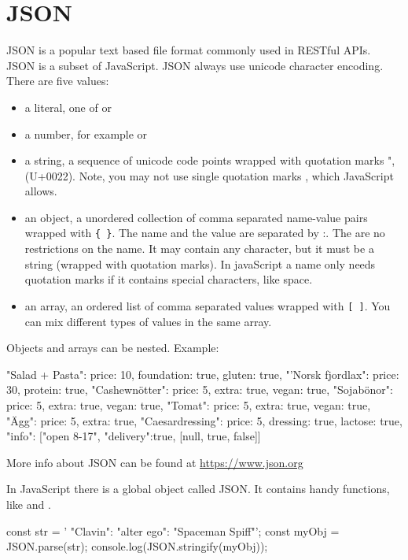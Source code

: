 \section{JSON} \label{section:json}
JSON is a popular text based file format commonly used in RESTful APIs. JSON is a subset of JavaScript. JSON always use unicode character encoding. There are five values:
\begin{itemize}
  \item a literal, one of  or 
  \item a number, for example  or 
  \item a string, a sequence of unicode code points wrapped with quotation marks ", (U+0022). Note, you may not use single quotation marks , which JavaScript allows.
  \item an object, a unordered collection of comma separated name-value pairs wrapped with \texttt{\{ \}}. The name and the value are separated by :. The are no restrictions on the name. It may contain any character, but it must be a string (wrapped with quotation marks). In javaScript a name only needs quotation marks if it contains special characters, like space.
 \item an array, an ordered list of comma separated values wrapped with \texttt{[ ]}. You can mix different types of values in the same array.
\end{itemize}
Objects and arrays can be nested. Example:
\begin{Code}
{
  "Salad + Pasta": {price: 10, foundation: true, gluten: true},
  "'Norsk fjordlax": {price: 30, protein: true},
  "Cashewnötter": {price: 5, extra: true, vegan: true},
  "Sojabönor": {price: 5, extra: true, vegan: true},
  "Tomat": {price: 5, extra: true, vegan: true},
  "Ägg": {price: 5, extra: true},
  "Caesardressing": {price: 5, dressing: true, lactose: true},
  "info": ["open 8-17", {"delivery":true}, [null, true, false]]
}
\end{Code}
More info about JSON can be found at \url{https://www.json.org}

In JavaScript there is a global object called JSON. It contains handy functions, like  and .
\begin{Code}
const str = '{ "Clavin": {"alter ego": "Spaceman Spiff"}}';
const myObj = JSON.parse(str);
console.log(JSON.stringify(myObj)); 
\end{Code}

